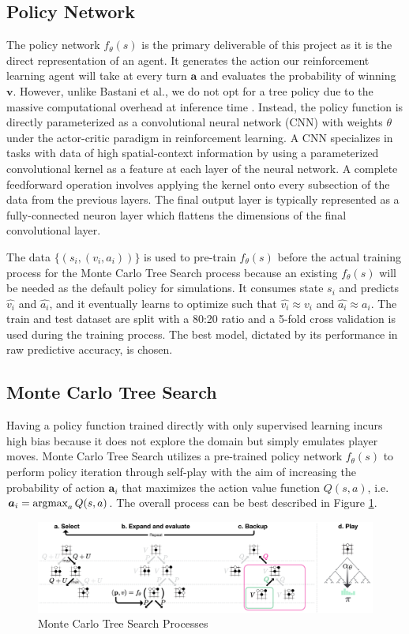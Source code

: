 \documentclass[letterpaper]{article} %
\begin{document}
\subsection{Policy Network}

The policy network $f_\theta(s)$ is the primary deliverable of this project as it is the direct representation of an agent. It generates the action our reinforcement learning agent will take at every turn $\bm{a}$ and evaluates the probability of winning $\bm{v}$. However, unlike Bastani et al., we do not opt for a tree policy due to the massive computational overhead at inference time \cite{bastani2018verifiable}. Instead, the policy function is directly parameterized as a convolutional neural network (CNN) with weights $\theta$ under the actor-critic paradigm in reinforcement learning. A CNN specializes in tasks with data of high spatial-context information by using a parameterized convolutional kernel as a feature at each layer of the neural network. A complete feedforward operation involves applying the kernel onto every subsection of the data from the previous layers. The final output layer is typically represented as a fully-connected neuron layer which flattens the dimensions of the final convolutional layer.

The data $\{(s_i, (v_i, a_i))\}$ is used to pre-train $f_\theta(s)$ before the actual training process for the Monte Carlo Tree Search process because an existing $f_\theta(s)$ will be needed as the default policy for simulations. It consumes state $s_i$ and predicts $\hat{v_i}$ and $\hat{a_i}$, and it eventually learns to optimize such that $\hat{v_i} \approx v_i$ and $\hat{a_i} \approx a_i$. The train and test dataset are split with a 80:20 ratio and a 5-fold cross validation is used during the training process. The best model, dictated by its performance in raw predictive accuracy, is chosen.

\subsection{Monte Carlo Tree Search}

Having a policy function trained directly with only supervised learning incurs high bias because it does not explore the domain but simply emulates player moves. Monte Carlo Tree Search utilizes a pre-trained policy network $f_\theta(s)$ to perform policy iteration through self-play with the aim of increasing the probability of action $\bm{a}_i$ that maximizes the action value function $Q(s,a)$, i.e. $\bm{a}_i = \operatorname*{argmax}_{a} Q(s, a)$. The overall process can be best described in Figure \ref{mcts_steps}.
\begin{figure}[t!]
	\centering
	\includegraphics[scale=0.2]{figures/mcts_steps.png}
	\caption{Monte Carlo Tree Search Processes \cite{alphago2016}}
	\label{mcts_steps}
\end{figure}
\end{document}
